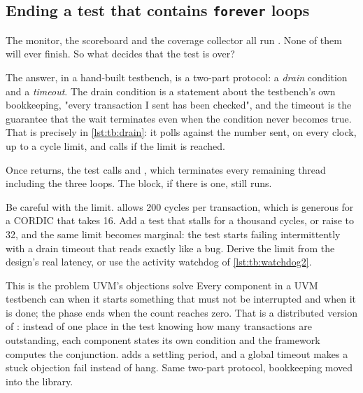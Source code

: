 \subsection{Ending a test that contains \texttt{forever} loops}

The monitor, the scoreboard and the coverage collector all run
. None of them will ever finish. So what decides that the test is
over?

The answer, in a hand-built testbench, is a two-part protocol: a
\emph{drain} condition and a \emph{timeout}. The drain condition is a
statement about the testbench's own bookkeeping, "every transaction I sent has
been checked", and the timeout is the guarantee that the wait terminates
even when the condition never becomes true. That is precisely
 in \cref{lst:tb:drain}: it polls 
against the number sent, on every clock, up to a cycle limit, and calls
 if the limit is reached.

Once  returns, the test calls  and
, which terminates every remaining thread including the three
 loops. The  block, if there is one, still runs.

Be careful with the limit.  allows 200 cycles per
transaction, which is generous for a CORDIC that takes 16. Add a test that
stalls  for a thousand cycles, or raise  to 32, and
the same limit becomes marginal: the test starts failing intermittently with a
drain timeout that reads exactly like a \DUT{} bug. Derive the limit from the
design's real latency, or use the activity watchdog of
\cref{lst:tb:watchdog2}.

\begin{notebox}{This is the problem UVM's objections solve}
Every component in a UVM testbench can  when it starts
something that must not be interrupted and  when it is
done; the phase ends when the count reaches zero. That is a distributed version
of : instead of one place in the test knowing how many
transactions are outstanding, each component states its own condition and the
framework computes the conjunction.  adds a settling
period, and a global timeout makes a stuck objection fail instead of hang. Same
two-part protocol, bookkeeping moved into the library.
\end{notebox}

